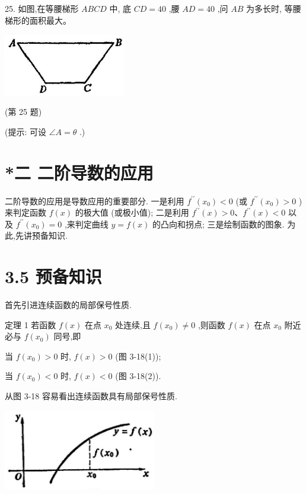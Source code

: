 \documentclass[10pt]{article}
\begin{document}
25. 如图,在等腰梯形 \({ABCD}\) 中, 底 \({CD} = {40}\) ,腰 \({AD} = {40}\) ,问 \({AB}\) 为多长时, 等腰梯形的面积最大。

\begin{center}
\includegraphics[max width=0.4\textwidth]{images/01912c18-5c3f-733d-b775-749ba9897a9d_159_135403.jpg}
\end{center}

(第 25 题)

(提示: 可设 \(\angle A = \theta\) .)

\section*{*二 二阶导数的应用}

二阶导数的应用是导数应用的重要部分. 一是利用 \({f}^{\prime \prime }\left( {x}_{0}\right) < 0\) (或 \({f}^{\prime \prime }\left( {x}_{0}\right) > 0\) ) 来判定函数 \(f\left( x\right)\) 的极大值 (或极小值); 二是利用 \({f}^{\prime \prime }\left( x\right) > 0\text{、}{f}^{\prime \prime }\left( x\right) < 0\) 以及 \({f}^{\prime \prime }\left( {x}_{0}\right) = 0\) ,来判定曲线 \(y = f\left( x\right)\) 的凸向和拐点; 三是绘制函数的图象. 为此,先讲预备知识.

\section*{3.5 预备知识}

首先引进连续函数的局部保号性质.

定理 1 若函数 \(f\left( x\right)\) 在点 \({x}_{0}\) 处连续,且 \(f\left( {x}_{0}\right) \neq 0\) ,则函数 \(f\left( x\right)\) 在点 \({x}_{0}\) 附近必与 \(f\left( {x}_{0}\right)\) 同号,即

当 \(f\left( {x}_{0}\right) > 0\) 时, \(f\left( x\right) > 0\) (图 3-18(1));

当 \(f\left( {x}_{0}\right) < 0\) 时, \(f\left( x\right) < 0\) (图 3-18(2)).

从图 3-18 容易看出连续函数具有局部保号性质.

\begin{center}
\includegraphics[max width=0.5\textwidth]{images/01912c18-5c3f-733d-b775-749ba9897a9d_160_145040.jpg}
\end{center}
\end{document}
